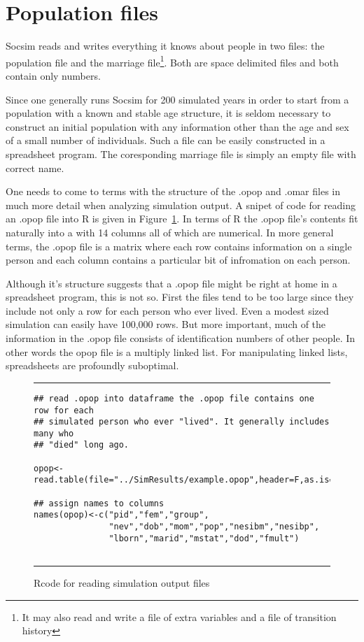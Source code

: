 
\section{Population  files}
\label{sec:populationFile}

Socsim reads and writes everything it knows about people in two files:
the population   file and the marriage 
file\footnote{It may also read and write a file of extra variables and
  a file of transition history}.  Both are
space delimited files and both contain only numbers. 

Since one generally runs Socsim for 200 simulated years in order to
start from a population with a known and stable age structure, it is
seldom necessary to construct an initial population with any
information other than the age and sex of a small number of
individuals. Such a file can be easily constructed in a spreadsheet
program.  The coresponding marriage file is simply an empty file with
correct name.

One needs to come to terms with the structure of the .opop and .omar
files in much more detail when analyzing simulation output.  A snipet
of code for reading an .opop file into R is given in
Figure~\ref{fig:readOpop}.  In terms of R the .opop file's contents
fit naturally into a  with 14 columns all of which are
numerical. In more general terms, the .opop file is a matrix where
each row contains information on a single person and each column
contains a particular bit of infromation on each person. 

Although it's structure suggests that a .opop file might be right at
home in a spreadsheet program, this is not so.  First the files tend
to be too large since they include not only a row for each person who
ever lived. Even a modest sized simulation can easily have 100,000
rows.  But more important, much of the information in the .opop file
consists of identification numbers of other people.  In other words
the opop file is a multiply linked list.  For manipulating linked
lists, spreadsheets are profoundly suboptimal.

\begin{figure}[h]
  \centering
\vspace{.25cm}
\rule{.5\textwidth}{.1mm}
\begin{verbatim}
## read .opop into dataframe the .opop file contains one row for each
## simulated person who ever "lived". It generally includes many who
## "died" long ago.

opop<-read.table(file="../SimResults/example.opop",header=F,as.is=T)

## assign names to columns
names(opop)<-c("pid","fem","group",
               "nev","dob","mom","pop","nesibm","nesibp",
               "lborn","marid","mstat","dod","fmult")


\end{verbatim}
  \caption{Rcode for reading simulation output files}
\rule{.5\textwidth}{.1mm}
  \label{fig:readOpop}

\end{figure}


